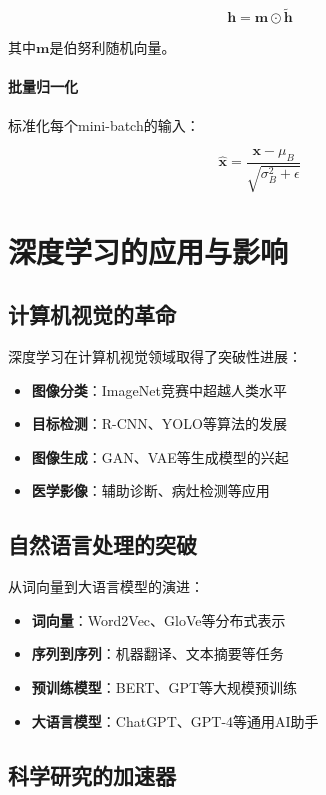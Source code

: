 $$\mathbf{h} = \mathbf{m} \odot \tilde{\mathbf{h}}$$

其中$\mathbf{m}$是伯努利随机向量。

\paragraph{批量归一化}
标准化每个mini-batch的输入：

$$\hat{\mathbf{x}} = \frac{\mathbf{x} - \mu_B}{\sqrt{\sigma_B^2 + \epsilon}}$$

\section{深度学习的应用与影响}

\subsection{计算机视觉的革命}

深度学习在计算机视觉领域取得了突破性进展：

\begin{itemize}
\item \textbf{图像分类}：ImageNet竞赛中超越人类水平
\item \textbf{目标检测}：R-CNN、YOLO等算法的发展
\item \textbf{图像生成}：GAN、VAE等生成模型的兴起
\item \textbf{医学影像}：辅助诊断、病灶检测等应用
\end{itemize}

\subsection{自然语言处理的突破}

从词向量到大语言模型的演进：

\begin{itemize}
\item \textbf{词向量}：Word2Vec、GloVe等分布式表示
\item \textbf{序列到序列}：机器翻译、文本摘要等任务
\item \textbf{预训练模型}：BERT、GPT等大规模预训练
\item \textbf{大语言模型}：ChatGPT、GPT-4等通用AI助手
\end{itemize}

\subsection{科学研究的加速器}

